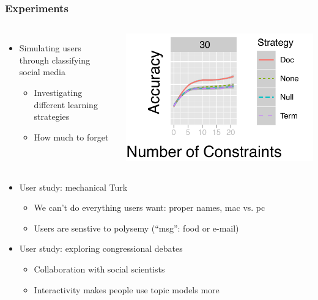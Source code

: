 \documentclass[compress]{beamer}
\begin{document}
\begin{frame}

        \frametitle{Experiments}

\begin{columns}


  \begin{itemize}
   \item Simulating users through classifying social media
     \begin{itemize}
       \item Investigating different learning strategies
       \item How much to forget
     \end{itemize}
   \end{itemize}


\begin{center}
\includegraphics[width=\linewidth]{interactive_topic_models/ablation_30_topics}
\end{center}

\end{columns}

\begin{itemize}
    \item User study: mechanical Turk
      \begin{itemize}
        \item We can't do everything users want: proper names, mac vs. pc
        \item Users are senstive to polysemy (``msg'': food or e-mail)
      \end{itemize}
    \item User study: exploring congressional debates
      \begin{itemize}
        \item Collaboration with social scientists
        \item Interactivity makes people use topic models more
       \end{itemize}
  \end{itemize}


\end{frame}
\end{document}
